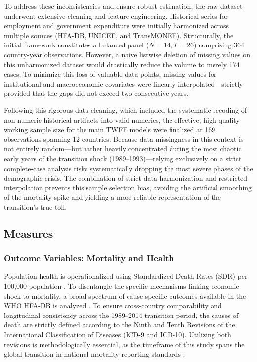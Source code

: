 \documentclass[12pt]{article}
\begin{document}
To address these inconsistencies and ensure robust estimation, the raw dataset underwent extensive cleaning and feature engineering. Historical series for employment 
and government expenditure were initially harmonized across multiple sources (HFA-DB, UNICEF, and TransMONEE). Structurally, the initial framework constitutes a balanced 
panel ($N=14, T=26$) comprising 364 country-year observations. However, a naive listwise deletion of missing values on this unharmonized dataset would drastically reduce 
the volume to merely 174 cases. To minimize this loss of valuable data points, missing values for institutional and macroeconomic covariates were linearly interpolated---strictly 
provided that the gaps did not exceed two consecutive years. 

Following this rigorous data cleaning, which included the systematic recoding of non-numeric historical artifacts into valid numerics, the effective, high-quality working sample size 
for the main TWFE models were finalized at 169 observations spanning 12 countries. Because data missingness in this context is not entirely random---but rather heavily concentrated during 
the most chaotic early years of the transition shock (1989--1993)---relying exclusively on a strict complete-case analysis risks systematically dropping the most severe phases 
of the demographic crisis. The combination of strict data harmonization and restricted interpolation prevents this sample selection bias, avoiding the artificial smoothing of the 
mortality spike and yielding a more reliable representation of the transition's true toll.

\subsection{Measures}

\subsubsection*{Outcome Variables: Mortality and Health}

Population health is operationalized using Standardized Death Rates (SDR) per 100,000 population \citep{B_Brainerd1998, Stuckler2009}. To disentangle the 
specific mechanisms linking economic shock to mortality, a broad spectrum of cause-specific outcomes available in the WHO HFA-DB is analyzed \citep{WHO_HFA}. 
To ensure cross-country comparability and longitudinal consistency across the 1989--2014 transition period, the causes of death are strictly defined according 
to the Ninth and Tenth Revisions of the International Classification of Diseases (ICD-9 and ICD-10). Utilizing both revisions is methodologically 
essential, as the timeframe of this study spans the global transition in national mortality reporting standards \citep{WHO1977, WHO1992}.
\end{document}

